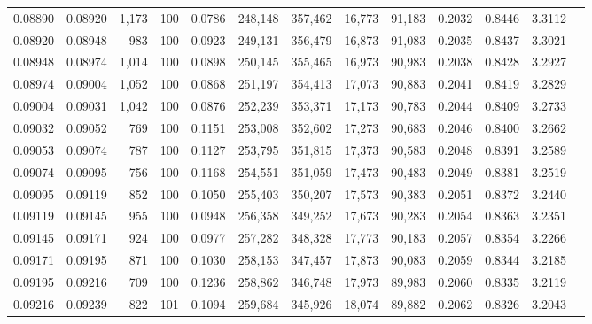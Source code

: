 \begin{tabular}{rrrrrrrrrrrrr}
0.08890 & 0.08920 & 1,173 & 100 &                                     0.0786 & 248,148 & 357,462 &  16,773 &  91,183 & 0.2032 & 0.8446 & 3.3112 \\
0.08920 & 0.08948 &   983 & 100 &                                     0.0923 & 249,131 & 356,479 &  16,873 &  91,083 & 0.2035 & 0.8437 & 3.3021 \\
0.08948 & 0.08974 & 1,014 & 100 &                                     0.0898 & 250,145 & 355,465 &  16,973 &  90,983 & 0.2038 & 0.8428 & 3.2927 \\
0.08974 & 0.09004 & 1,052 & 100 &                                     0.0868 & 251,197 & 354,413 &  17,073 &  90,883 & 0.2041 & 0.8419 & 3.2829 \\
0.09004 & 0.09031 & 1,042 & 100 &                                     0.0876 & 252,239 & 353,371 &  17,173 &  90,783 & 0.2044 & 0.8409 & 3.2733 \\
0.09032 & 0.09052 &   769 & 100 &                                     0.1151 & 253,008 & 352,602 &  17,273 &  90,683 & 0.2046 & 0.8400 & 3.2662 \\
0.09053 & 0.09074 &   787 & 100 &                                     0.1127 & 253,795 & 351,815 &  17,373 &  90,583 & 0.2048 & 0.8391 & 3.2589 \\
0.09074 & 0.09095 &   756 & 100 &                                     0.1168 & 254,551 & 351,059 &  17,473 &  90,483 & 0.2049 & 0.8381 & 3.2519 \\
0.09095 & 0.09119 &   852 & 100 &                                     0.1050 & 255,403 & 350,207 &  17,573 &  90,383 & 0.2051 & 0.8372 & 3.2440 \\
0.09119 & 0.09145 &   955 & 100 &                                     0.0948 & 256,358 & 349,252 &  17,673 &  90,283 & 0.2054 & 0.8363 & 3.2351 \\
0.09145 & 0.09171 &   924 & 100 &                                     0.0977 & 257,282 & 348,328 &  17,773 &  90,183 & 0.2057 & 0.8354 & 3.2266 \\
0.09171 & 0.09195 &   871 & 100 &                                     0.1030 & 258,153 & 347,457 &  17,873 &  90,083 & 0.2059 & 0.8344 & 3.2185 \\
0.09195 & 0.09216 &   709 & 100 &                                     0.1236 & 258,862 & 346,748 &  17,973 &  89,983 & 0.2060 & 0.8335 & 3.2119 \\
0.09216 & 0.09239 &   822 & 101 &                                     0.1094 & 259,684 & 345,926 &  18,074 &  89,882 & 0.2062 & 0.8326 & 3.2043 \\

\end{tabular}

